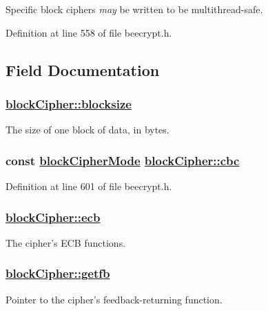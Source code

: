 Specific block ciphers {\em may\/} be written to be multithread-safe. 

Definition at line 558 of file beecrypt.h.

\subsection{Field Documentation}
\hypertarget{structblockCipher_o2}{
\subsubsection[blocksize]{\setlength{\rightskip}{0pt plus 5cm}\hyperlink{structblockCipher_o2}{block\-Cipher::blocksize}}}
\label{structblockCipher_o2}


The size of one block of data, in bytes. 

\hypertarget{structblockCipher_o10}{
\subsubsection[cbc]{\setlength{\rightskip}{0pt plus 5cm}const \hyperlink{structblockCipherMode}{block\-Cipher\-Mode} \hyperlink{structblockCipher_o10}{block\-Cipher::cbc}}}
\label{structblockCipher_o10}


Definition at line 601 of file beecrypt.h.\hypertarget{structblockCipher_o9}{
\subsubsection[ecb]{\setlength{\rightskip}{0pt plus 5cm}\hyperlink{structblockCipher_o9}{block\-Cipher::ecb}}}
\label{structblockCipher_o9}


The cipher's ECB functions. 

\hypertarget{structblockCipher_o11}{
\subsubsection[getfb]{\setlength{\rightskip}{0pt plus 5cm}\hyperlink{structblockCipher_o11}{block\-Cipher::getfb}}}
\label{structblockCipher_o11}


Pointer to the cipher's feedback-returning function. 

